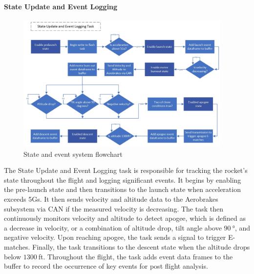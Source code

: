 \paragraph{State Update and Event Logging}
\begin{figure}[ht!]
  \begin{center}
    \includegraphics[width=0.95\textwidth]{./img/Section_4_2_2_3.jpeg}
  \end{center}
  \caption{State and event system flowchart}\label{fig:flowchart-event}
\end{figure}

The State Update and Event Logging task is responsible for tracking the rocket's state throughout the flight and logging significant events. It begins by enabling the pre-launch state and then transitions to the launch state when acceleration exceeds 5Gs. It then sends velocity and altitude data to the Aerobrakes subsystem via CAN if the measured velocity is decreasing. The task then continuously monitors velocity and altitude to detect apogee, which is defined as a decrease in velocity, or a combination of altitude drop, tilt angle above $\SI{90}{\degree}$, and negative velocity. Upon reaching apogee, the task sends a signal to trigger E-matches. Finally, the task transitions to the descent state when the altitude drops below $\SI{1300}{}$ft. Throughout the flight, the task adds event data frames to the buffer to record the occurrence of key events for post flight analysis.  

